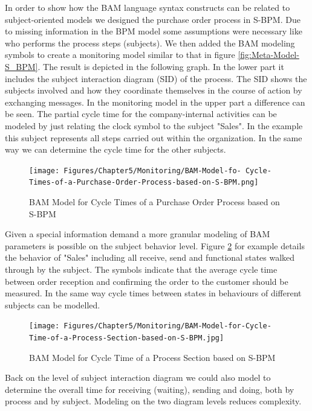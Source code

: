 In order to show how the BAM language syntax constructs can be related to subject-oriented models we designed the purchase order process in S-BPM. Due to missing information in the BPM model some assumptions were necessary like who performs the process steps (subjects). We then added the BAM modeling symbols to create a monitoring model similar to that in figure \ref{fig:Meta-Model-S_BPM}.
The result is depicted in the following graph. In the lower part it includes the subject interaction diagram (SID) of the process. The SID shows the subjects involved and how they coordinate themselves in the course of action by exchanging messages. In the monitoring model in the upper part a difference can be seen. The partial cycle time for the company-internal activities can be modeled by just relating the clock symbol to the subject "Sales". In the example this subject represents all steps carried out within the organization. In the same way we can determine the cycle time for the other subjects.

\begin{figure}[htbp]
	\centering
	\texttt{[image: Figures/Chapter5/Monitoring/BAM-Model-fo- Cycle-Times-of-a-Purchase-Order-Process-based-on-S-BPM.png]}
	\caption[BAM Model for Cycle Times of a Purchase Order Process based on S-BPM]{BAM Model for Cycle Times of a Purchase Order Process based on S-BPM}
	\label{fig:Cycle-Time-SBPM}
\end{figure}

Given a special information demand a more granular modeling of BAM parameters is possible on the subject behavior level. Figure \ref{fig:BAM-Cycle-Time} for example details the behavior of "Sales" including all receive, send and functional states walked through by the subject. The symbols indicate that the average cycle time between order reception and confirming the order to the customer should be measured. In the same way cycle times between states in behaviours of different subjects can be modelled.


\begin{figure}[htbp]
	\centering
	\texttt{[image: Figures/Chapter5/Monitoring/BAM-Model-for-Cycle-Time-of-a-Process-Section-based-on-S-BPM.jpg]}
	\caption[BAM Model for Cycle Time of a Process Section based on S-BPM]{BAM Model for Cycle Time of a Process Section based on S-BPM}
	\label{fig:BAM-Cycle-Time}
\end{figure}

Back on the level of subject interaction diagram we could also model to determine the overall time for receiving (waiting), sending and doing, both by process and by subject. Modeling on the two diagram levels reduces complexity.

